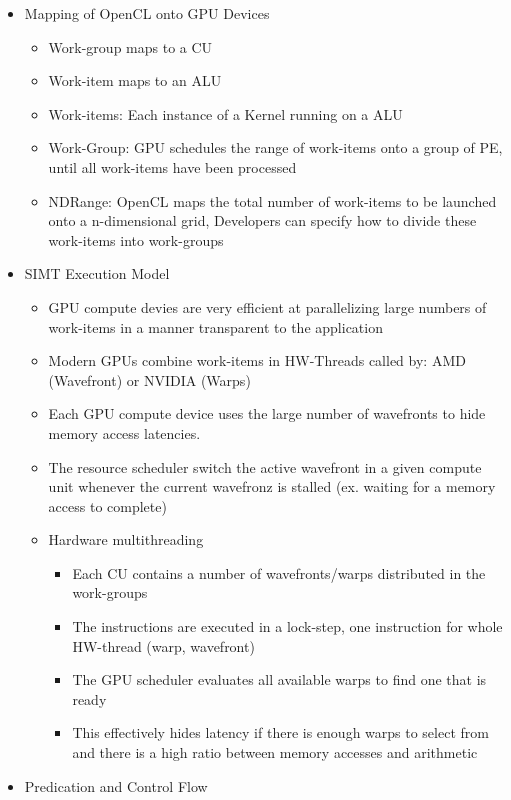 \documentclass[paper=a4, fontsize=11pt]{scrartcl} %
\numberwithin{equation}{section} %
\numberwithin{figure}{section} %
\numberwithin{table}{section} %
\begin{document}
\begin{itemize}
  \item Mapping of OpenCL onto GPU Devices
  \begin{itemize}
    \item Work-group maps to a CU
    \item Work-item maps to an ALU
    \item Work-items: Each instance of a Kernel running on a ALU
    \item Work-Group: GPU schedules the range of work-items onto a group of PE, until all work-items have been processed
    \item NDRange: OpenCL maps the total number of work-items to be launched onto a n-dimensional grid, Developers can specify how to divide these work-items into work-groups
  \end{itemize}
  \item SIMT Execution Model
  \begin{itemize}
    \item GPU compute devies are very efficient at parallelizing large numbers of work-items in a manner transparent to the application
    \item Modern GPUs combine work-items in HW-Threads called by: AMD (Wavefront) or NVIDIA (Warps)
    \item Each GPU compute device uses the large number of wavefronts to hide memory access latencies.
    \item The resource scheduler switch the active wavefront in a given compute unit whenever the current wavefronz is stalled (ex. waiting for a memory access to complete)
    \item Hardware multithreading
    \begin{itemize}
      \item Each CU contains a number of wavefronts/warps distributed in the work-groups
      \item The instructions are executed in a lock-step, one instruction for whole HW-thread (warp, wavefront)
      \item The GPU scheduler evaluates all available warps to find one that is ready
      \item This effectively hides latency if there is enough warps to select from and there is a high ratio between memory accesses and arithmetic
    \end{itemize}
  \end{itemize}
  \item Predication and Control Flow

\end{itemize}
\end{document}
